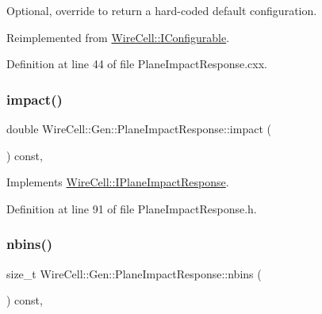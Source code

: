 Optional, override to return a hard-\/coded default configuration. 



Reimplemented from \hyperlink{class_wire_cell_1_1_i_configurable_a54841b2da3d1ea02189478bff96f7998}{Wire\+Cell\+::\+I\+Configurable}.



Definition at line 44 of file Plane\+Impact\+Response.\+cxx.

\mbox{\label{class_wire_cell_1_1_gen_1_1_plane_impact_response_ae0d3d3611d894db56f398abbf67d3373}} 
\subsubsection{\texorpdfstring{impact()}{impact()}}
{\footnotesize\ttfamily double Wire\+Cell\+::\+Gen\+::\+Plane\+Impact\+Response\+::impact (\begin{DoxyParamCaption}{ }\end{DoxyParamCaption}) const\hspace{0.3cm}{\ttfamily [inline]}, {\ttfamily [virtual]}}



Implements \hyperlink{class_wire_cell_1_1_i_plane_impact_response_a3259cbe4883bce2cb4010e0667ec957b}{Wire\+Cell\+::\+I\+Plane\+Impact\+Response}.



Definition at line 91 of file Plane\+Impact\+Response.\+h.

\mbox{\label{class_wire_cell_1_1_gen_1_1_plane_impact_response_ae6ff423372c28e1fec5e13a47d1648d2}} 
\subsubsection{\texorpdfstring{nbins()}{nbins()}}
{\footnotesize\ttfamily size\+\_\+t Wire\+Cell\+::\+Gen\+::\+Plane\+Impact\+Response\+::nbins (\begin{DoxyParamCaption}{ }\end{DoxyParamCaption}) const\hspace{0.3cm}{\ttfamily [inline]}, {\ttfamily [virtual]}}




